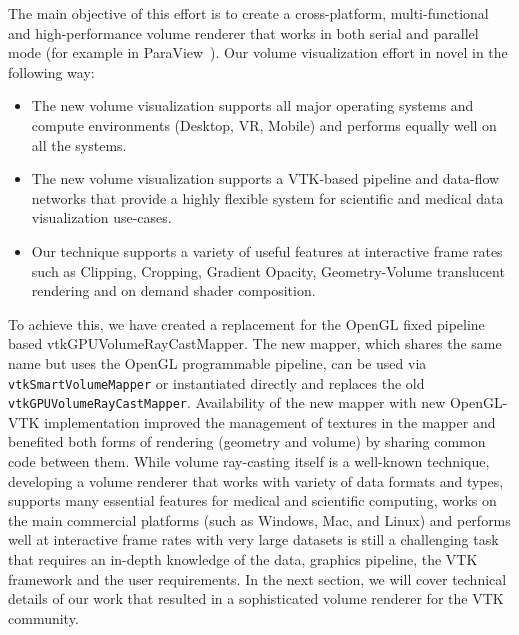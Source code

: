 The main objective of this effort is to create a cross-platform,
multi-functional and high-performance volume renderer that works in both serial
and parallel mode (for example in
ParaView~\citep{ahrens_paraview:_2005,ayachit_paraview_2015}). Our volume
visualization effort in novel in the following way:

\begin{itemize}
\item The new volume visualization supports all major operating systems and compute environments (Desktop, VR, Mobile) and performs equally
well on all the systems.

\item The new volume visualization supports a VTK-based pipeline and data-flow networks that provide a highly flexible system for scientific and medical data visualization use-cases.

\item Our technique supports a variety of useful features at interactive frame
rates such as Clipping, Cropping, Gradient Opacity, Geometry-Volume translucent
rendering and on demand shader composition.
\end{itemize}

To achieve this, we have created a replacement for the OpenGL fixed pipeline based
vtkGPUVolumeRayCastMapper. The new mapper, which shares the same name but uses
the OpenGL programmable pipeline, can be used via \texttt{vtkSmartVolumeMapper} or
instantiated directly and replaces the old \texttt{vtkGPUVolumeRayCastMapper}.
Availability of the new mapper with new OpenGL-VTK implementation improved the
management of textures in the mapper and benefited both forms of rendering
(geometry and volume) by sharing common code between them. While volume
ray-casting itself is a well-known technique, developing a volume renderer that
works with variety of data formats and types, supports many essential features
for medical and scientific computing, works on the main commercial platforms
(such as Windows, Mac, and Linux) and performs well at interactive frame rates
with very large datasets is still a challenging task that requires an in-depth
knowledge of the data, graphics pipeline, the VTK framework and the user
requirements.  In the next section, we will cover technical details of our work
that resulted in a sophisticated volume renderer for the VTK community.

